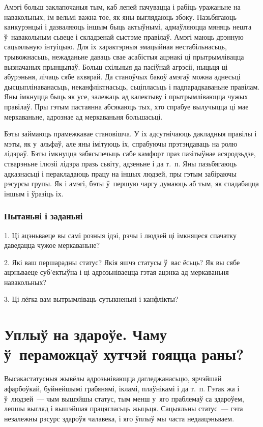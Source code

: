 Амэгі больш заклапочаныя тым, каб лепей пачувацца і рабіць уражаньне на навакольных, ім вельмі важна тое, як яны выглядаюць збоку. Пазьбягаюць канкурэнцыі і дазваляюць іншым быць актыўнымі, адмаўляюцца мяняць нешта ў~навакольным сьвеце і складзенай сыстэме правілаў. Амэгі маюць дрэнную сацыяльную інтуіцыю. Для іх характэрныя эмацыйная нестабільнасьць, трывожнасьць, нежаданьне даваць свае асабістыя ацэнакі ці прытрымлівацца вызначаных прынцыпаў. Больш схільныя да пасіўнай агрэсіі, ныцьця ці абурэньня, лічаць сябе ахвярай. Да станоўчых бакоў амэгаў можна аднесьці дысцыплінаванасьць, неканфліктнасьць, сьціпласьць і падпарадкаваньне правілам. Яны імкнуцца быць як усе, залежаць ад калектыву і прытрымліваюцца чужых правілаў. Пры гэтым пастаянна абсякаюць тых, хто спрабуе вылучыцца ці мае меркаваньне, адрознае ад меркаваньня большасьці.

Бэты займаюць прамежкавае становішча. У іх адсутнічаюць дакладныя правілы і мэты, як у~альфаў, але яны імітуюць іх, спрабуючы прэтэндаваць на ролю лідэраў. Бэты імкнуцца забясьпечыць сабе камфорт праз пазітыўнае асяродзьдзе, стварэньне ілюзіі лідэра празь сьвіту, адзеньне і да т.~п. Яны пазьбягаюць адказнасьці і перакладаюць працу на іншых людзей, пры гэтым забіраючы рэсурсы групы. Як і амэгі, бэты ў~першую чаргу думаюць аб тым, як спадабацца іншым і ўразіць іх.

\subsubsection{Пытаньні і заданьні}

1. Ці ацэньваеце вы самі розныя ідэі, рэчы і людзей ці імкняцеся спачатку даведацца чужое меркаваньне?

2. Які ваш першарадны статус? Якія яшчэ статусы ў~вас ёсьць? Як вы сябе ацэньваеце суб'ектыўна і ці адрозьніваецца гэтая ацэнка ад меркаваньня навакольных?

3. Ці лёгка вам вытрымліваць сутыкненьні і канфлікты?


\section{Уплыў на здароўе. Чаму ў~пераможцаў хутчэй гояцца раны?}

Высакастатусныя жывёлы адрозьніваюцца дагледжанасьцю, ярчэйшай афарбоўкай, буйнейшымі грабянямі, ікламі, плаўнікамі і да т.~п. Гэтак жа і ў~людзей~--- чым вышэйшы статус, тым менш у~яго праблемаў са здароўем, лепшы выгляд і вышэйшая працягласьць жыцьця. Сацыяльны статус~--- гэта незалежны рэсурс здароўя чалавека, і яго ўплыў мы часта недаацэньваем. 

